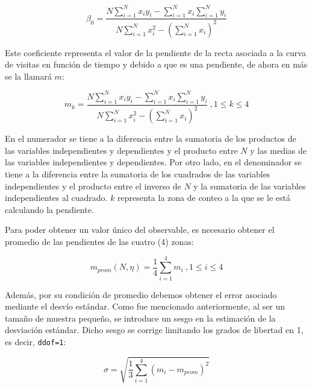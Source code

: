 \documentclass[11pt, a4paper]{article}
\begin{document}
            \begin{equation}
                \beta_0 = \frac{N \sum_{i=1}^N x_i y_i - \sum_{i=1}^N x_i \sum_{i=1}^N y_i }{N \sum_{i=1}^N x_i^2 - \left(\sum_{i=1}^N x_i \right)^2}
            \end{equation}

            Este coeficiente representa el valor de la pendiente de la recta asociada a la curva de visitas en función de tiempo y
            debido a que es una pendiente, de ahora en más se la llamará $m$:

            \begin{equation}
                m_k = \frac{N \sum_{i=1}^N x_i y_i - \sum_{i=1}^N x_i \sum_{i=1}^N y_i }{N \sum_{i=1}^N x_i^2 - \left(\sum_{i=1}^N x_i \right)^2}
                \ , 1 \leq k \leq 4
            \end{equation}

            En el numerador se tiene a la diferencia entre la sumatoria de los productos de las variables independientes y dependientes
            y el producto entre $N$ y las medias de las variables independientes y dependientes.
            Por otro lado, en el denominador se tiene a la diferencia entre la sumatoria de los cuadrados de las variables independientes
            y el producto entre el inverso de $N$ y la sumatoria de las variables independientes al cuadrado.
            $k$ representa la zona de conteo a la que se le está calculando la pendiente.

            Para poder obtener un valor único del observable, es necesario obtener el promedio de las pendientes de las cuatro (4) zonas:

            \begin{equation}
                m_{prom}(N,\eta) = \frac{1}{4} \sum_{i=1}^{4} m_i \ , 1 \leq i \leq 4
            \end{equation}

            Además, por su condición de promedio debemos obtener el error asociado mediante el desvío estándar.
            Como fue mencionado anteriormente, al ser un tamaño de muestra pequeño, se introduce un sesgo en la estimación de la desviación estándar. Dicho sesgo se corrige limitando los grados de libertad en 1, es decir, \texttt{ddof=1}:

            \begin{equation}
                \sigma = \sqrt{\frac{1}{3} \sum_{i=1}^{4} (m_i - m_{prom})^2}
            \end{equation}
\end{document}
